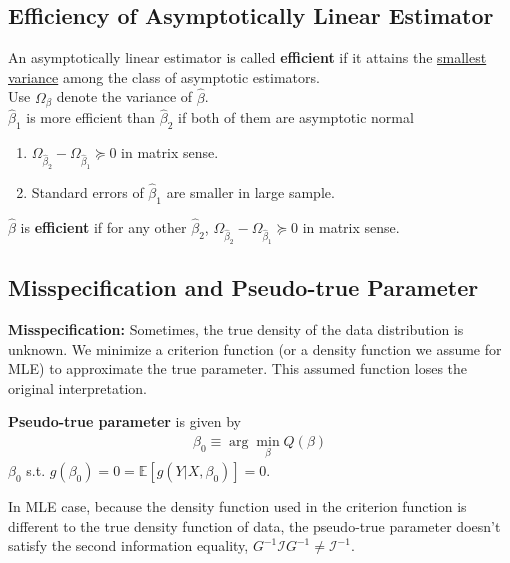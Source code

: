 \documentclass[11pt]{elegantbook}
\begin{document}
\subsection{Efficiency of Asymptotically Linear Estimator}
\begin{definition}
    \normalfont
    An asymptotically linear estimator is called \textbf{efficient} if it attains the \underline{smallest variance} among the class of asymptotic estimators.\\
    Use $\Omega_{\beta}$ denote the variance of $\hat{\beta}$.\\
    $\hat{\beta}_1$ is more efficient than $\hat{\beta}_2$ if both of them are asymptotic normal
    \begin{enumerate}[$\cdot$]
        \item $\Omega_{\hat{\beta}_2}-\Omega_{\hat{\beta}_1}\succeq 0$ in matrix sense.
        \item Standard errors of $\hat{\beta}_1$ are smaller in large sample.
    \end{enumerate}
    $\hat{\beta}$ is \textbf{efficient} if for any other $\hat{\beta}_2$, $\Omega_{\hat{\beta}_2}-\Omega_{\hat{\beta}_1}\succeq 0$ in matrix sense.
\end{definition}


\subsection{Misspecification and Pseudo-true Parameter}
\textbf{Misspecification:} Sometimes, the true density of the data distribution is unknown. We minimize a criterion function (or a density function we assume for MLE) to approximate the true parameter. This assumed function loses the original interpretation.
\begin{definition}
\normalfont
    \textbf{Pseudo-true parameter} is given by
    \begin{equation}
        \begin{aligned}
            \beta_0\equiv \arg\min_\beta Q(\beta)
        \end{aligned}
        \nonumber
    \end{equation}
    $\beta_0$ s.t. $g(\beta_0)=0=\mathbb{E}[g(Y|X,\beta_0)]=0$.
\end{definition}
In MLE case, because the density function used in the criterion function is different to the true density function of data, the pseudo-true parameter doesn't satisfy the second information equality, $G^{-1}\mathcal{I}G^{-1}\neq \mathcal{I}^{-1}$.
\end{document}
